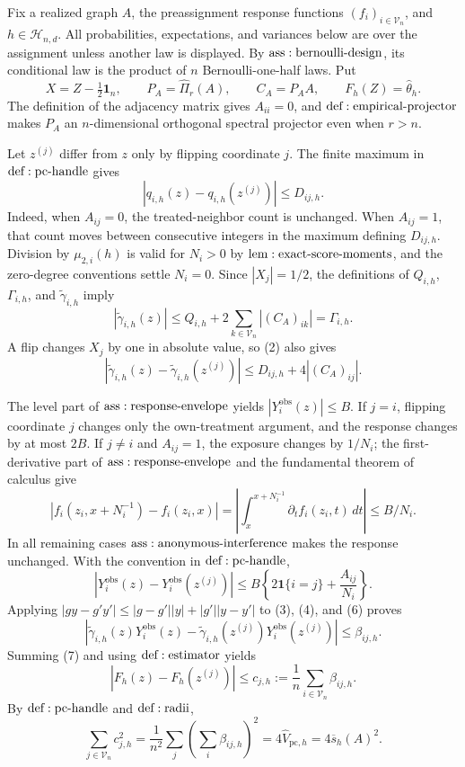 Fix a realized graph \(A\), the preassignment response functions \((f_i)_{i\in\mathcal V_n}\), and \(h\in\mathcal H_{n,d}\).  All probabilities, expectations, and variances below are over the assignment unless another law is displayed.  By \({\rm ass:bernoulli\text{-}design}\), its conditional law is the product of \(n\) Bernoulli-one-half laws.  Put
\[
 X=Z-\tfrac12\mathbf1_n,\qquad
 P_A=\widehat\Pi_r(A),\qquad C_A=P_AA,
 \qquad F_h(Z)=\widehat\theta_h.
\tag{1}
\]
The definition of the adjacency matrix gives \(A_{ii}=0\), and \({\rm def:empirical\text{-}projector}\) makes \(P_A\) an \(n\)-dimensional orthogonal spectral projector even when \(r>n\).

Let \(z^{(j)}\) differ from \(z\) only by flipping coordinate \(j\).  The finite maximum in \({\rm def:pc\text{-}handle}\) gives
\[
 |q_{i,h}(z)-q_{i,h}(z^{(j)})|\leq D_{ij,h}.
\tag{2}
\]
Indeed, when \(A_{ij}=0\), the treated-neighbor count is unchanged.  When \(A_{ij}=1\), that count moves between consecutive integers in the maximum defining \(D_{ij,h}\).  Division by \(\mu_{2,i}(h)\) is valid for \(N_i>0\) by \({\rm lem:exact\text{-}score\text{-}moments}\), and the zero-degree conventions settle \(N_i=0\).  Since \(|X_j|=1/2\), the definitions of \(Q_{i,h}\), \(\Gamma_{i,h}\), and \(\widetilde\gamma_{i,h}\) imply
\[
 |\widetilde\gamma_{i,h}(z)|
 \leq Q_{i,h}+2\sum_{k\in\mathcal V_n}|(C_A)_{ik}|
 =\Gamma_{i,h}.
\tag{3}
\]
A flip changes \(X_j\) by one in absolute value, so (2) also gives
\[
 |\widetilde\gamma_{i,h}(z)-\widetilde\gamma_{i,h}(z^{(j)})|
 \leq D_{ij,h}+4|(C_A)_{ij}|.
\tag{4}
\]

The level part of \({\rm ass:response\text{-}envelope}\) yields \(|Y_i^{\mathrm{obs}}(z)|\leq B\).  If \(j=i\), flipping coordinate \(j\) changes only the own-treatment argument, and the response changes by at most \(2B\).  If \(j\ne i\) and \(A_{ij}=1\), the exposure changes by \(1/N_i\); the first-derivative part of \({\rm ass:response\text{-}envelope}\) and the fundamental theorem of calculus give
\[
 |f_i(z_i,x+N_i^{-1})-f_i(z_i,x)|
 =\left|\int_x^{x+N_i^{-1}}\partial_t f_i(z_i,t)\,dt\right|
 \leq B/N_i.
\tag{5}
\]
In all remaining cases \({\rm ass:anonymous\text{-}interference}\) makes the response unchanged.  With the convention in \({\rm def:pc\text{-}handle}\),
\[
 |Y_i^{\mathrm{obs}}(z)-Y_i^{\mathrm{obs}}(z^{(j)})|
 \leq B\left\{2\mathbf1\{i=j\}+\frac{A_{ij}}{N_i}\right\}.
\tag{6}
\]
Applying \(|gy-g'y'|\leq|g-g'||y|+|g'||y-y'|\) to (3), (4), and (6) proves
\[
 |\widetilde\gamma_{i,h}(z)Y_i^{\mathrm{obs}}(z)
 -\widetilde\gamma_{i,h}(z^{(j)})Y_i^{\mathrm{obs}}(z^{(j)})|
 \leq\beta_{ij,h}.
\tag{7}
\]
Summing (7) and using \({\rm def:estimator}\) yields
\[
 |F_h(z)-F_h(z^{(j)})|
 \leq c_{j,h}:=\frac1n\sum_{i\in\mathcal V_n}\beta_{ij,h}.
\tag{8}
\]
By \({\rm def:pc\text{-}handle}\) and \({\rm def:radii}\),
\[
 \sum_{j\in\mathcal V_n}c_{j,h}^2
 =\frac1{n^2}\sum_j\left(\sum_i\beta_{ij,h}\right)^2
 =4\widehat V_{\mathrm{pc},h}=4\overline s_h(A)^2.
\tag{9}
\]

